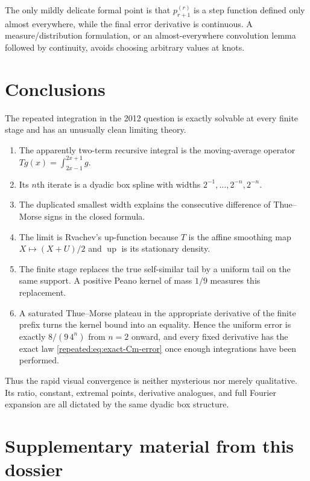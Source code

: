 \documentclass[11pt,oneside]{article}
\theoremstyle{definition}
\theoremstyle{remark}
\newcommand{\Up}{\operatorname{up}}
\begin{document}
The only mildly delicate formal point is that $p_{r+1}^{(r)}$ is a step function defined only
almost everywhere, while the final error derivative is continuous.  A measure/distribution
formulation, or an almost-everywhere convolution lemma followed by continuity, avoids choosing
arbitrary values at knots.

\section{Conclusions}
\label{repeated:sec:conclusion}

The repeated integration in the 2012 question is exactly solvable at every finite stage and
has an unusually clean limiting theory.

\begin{enumerate}
\item The apparently two-term recursive integral is the moving-average operator
      $Tg(x)=\int_{2x-1}^{2x+1}g$.
\item Its $n$th iterate is a dyadic box spline with widths
      $2^{-1},\ldots,2^{-n},2^{-n}$.
\item The duplicated smallest width explains the consecutive difference of Thue--Morse signs
      in the closed formula.
\item The limit is Rvachev's up-function because $T$ is the affine smoothing map
      $X\mapsto(X+U)/2$ and $\Up$ is its stationary density.
\item The finite stage replaces the true self-similar tail by a uniform tail on the same
      support.  A positive Peano kernel of mass $1/9$ measures this replacement.
\item A saturated Thue--Morse plateau in the appropriate derivative of the finite prefix turns
      the kernel bound into an equality.  Hence the uniform error is exactly
      $8/(9\,4^n)$ from $n=2$ onward, and every fixed derivative has the exact law
      \eqref{repeated:eq:exact-Cm-error} once enough integrations have been performed.
\end{enumerate}

Thus the rapid visual convergence is neither mysterious nor merely qualitative.  Its ratio,
constant, extremal points, derivative analogues, and full Fourier expansion are all dictated
by the same dyadic box structure.

\clearpage
\section*{Supplementary material from this dossier}
\end{document}
